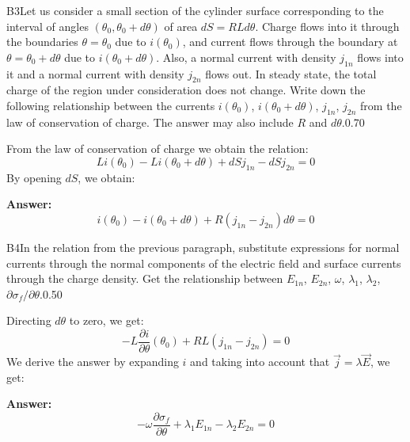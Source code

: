 \documentclass[11pt,a4paper]{article}
\begin{document}
\begin{solcard}{B3}{Let us consider a small section of the cylinder surface corresponding to the interval of angles $(\theta_0, \theta_0 + d\theta)$ of area $dS = RL d\theta$. Charge flows into it through the boundaries $\theta = \theta_0$ due to $i(\theta_0)$, and current flows through the boundary at $\theta = \theta_0 + d\theta$ due to $i(\theta_0 + d\theta)$. Also, a normal current with density $j_{1n}$ flows into it and a normal current with density $j_{2n}$ flows out. In steady state, the total charge of the region under consideration does not change. Write down the following relationship between the currents $i(\theta_0)$, $i(\theta_0 + d\theta)$, $j_{1n}$, $j_{2n}$ from the law of conservation of charge. The answer may also include $R$ and $d\theta$.}{0.70}

From the law of conservation of charge we obtain the relation: \[Li(\theta_0) - Li(\theta_0 + d\theta) + dSj_{1n} -dSj_{2n} = 0\]By opening $dS$, we obtain:

\par\smallskip\noindent\textbf{Answer:} \[i(\theta_0) - i(\theta_0 + d\theta) + R(j_{1n} -j_{2n})d\theta = 0\]
\end{solcard}

\begin{solcard}{B4}{In the relation from the previous paragraph, substitute expressions for normal currents through the normal components of the electric field and surface currents through the charge density. Get the relationship between $E_{1n}$, $E_{2n}$, $\omega$, $\lambda_1$, $\lambda_2$, $\partial \sigma_f/\partial \theta$.}{0.50}

Directing $d\theta$ to zero, we get: \[-L\dfrac{\partial i}{\partial \theta}(\theta_0) + RL(j_{1n} -j_{2n}) = 0\] We derive the answer by expanding $i$ and taking into account that $\vec j=\lambda \vec E$, we get:

\par\smallskip\noindent\textbf{Answer:} \[-\omega\dfrac{\partial \sigma_f}{\partial \theta}+ \lambda_1E_{1n} - \lambda_2E_{2n} = 0\]
\end{solcard}
\end{document}
